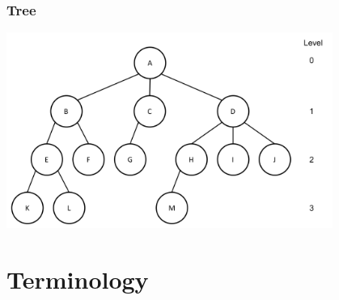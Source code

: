\documentclass[newPxFont,sthlmFooter,nooffset]{beamer}
\begin{document}
\begin{frame}[t]
  \frametitle{Tree}
  \begin{center}
    \includegraphics[width=0.8\textwidth]{figures/fig01_tree2.png}
  \end{center}

\end{frame}

\section{Terminology}
\end{document}

